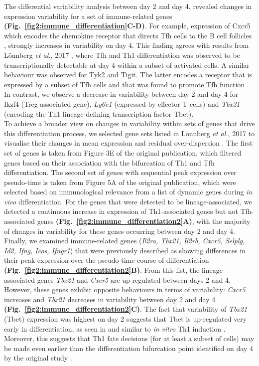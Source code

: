 The differential variability analysis between day 2 and day 4, revealed  changes in expression variability for a set of immune-related genes \textbf{(Fig.~\ref{fig2:immune_differentiation}C-D)}. 
For example, expression of \gls{Cxcr5} which encodes the chemokine receptor that directs Tfh cells to the B cell follicles \citep{Crotty2014}, strongly increases in variability on day 4. 
This finding agrees with results from L\"onnberg \emph{et al.}, 2017 \citep{Lonnberg2017}, where Tfh and Th1 differentiation was observed to be transcriptionally detectable at day 4 within a subset of activated cells. 
A similar behaviour was observed for \gls{Tyk2} and \gls{Tigit}. The latter encodes a receptor that is expressed by a subset of Tfh cells and that was found to promote Tfh function \citep{Godefroy2015}. 
In contrast, we observe a decrease in variability between day 2 and day 4 for \gls{Ikzf4} (Treg-associated gene), \textit{Ly6c1} (expressed by effector T cells) and \textit{Tbx21} (encoding the Th1 lineage-defining transcription factor Tbet). \\

To achieve a broader view on changes in variability within sets of genes that drive this differentiation process, we selected gene sets listed in L\"onnberg \emph{et al.}, 2017 to visualise their changes in mean expression and residual over-dispersion \citep{Lonnberg2017}. 
The first set of genes is taken from Figure 3E of the original publication, which filtered genes based on their association with the bifurcation of Th1 and Tfh differentiation. 
The second set of genes with sequential peak expression over pseudo-time is taken from Figure 5A of the original publication, which were selected based on immunological relevance from a list of dynamic genes during \textit{in vivo} differentiation. 
For the genes that were detected to be lineage-associated, we detected a continuous increase in expression of Th1-associated genes but not Tfh-associated genes \textbf{(Fig.~\ref{fig2:immune_differentiation2}A)}, with the majority of changes in variability for these genes occurring between day 2 and day 4. \\

Finally, we examined immune-related genes (\textit{Il2ra, Tbx21, Il2rb, Cxcr5, Selplg, Id2, Ifng, Icos, Ifngr1}) that were previously described as showing differences in their peak expression over the pseudo time course of differentiation \citep{Lonnberg2017} \textbf{(Fig.~\ref{fig2:immune_differentiation2}B)}. 
From this list, the lineage-associated genes \textit{Tbx21} and \textit{Cxcr5} are up-regulated between days 2 and 4. 
However, these genes  exhibit opposite behaviours in terms of variability: \textit{Cxcr5} increases and \textit{Tbx21} decreases in variability between day 2 and day 4 \textbf{(Fig.~\ref{fig2:immune_differentiation2}C)}. 
The fact that variability of \textit{Tbx21} (Tbet) expression was highest on day 2 suggests that Tbet is up-regulated very early in differentiation, as seen in \cite{Lonnberg2017} and similar to \textit{in vitro} Th1 induction \citep{Szabo2000}. 
Moreover, this suggests that Th1 fate decisions (for at least a subset of cells) may be made even earlier than the differentiation bifurcation point identified on day 4 by the original study \citep{Lonnberg2017}. 

